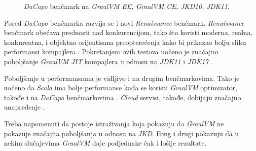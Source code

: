 \documentclass[a4paper]{article}
\begin{document}
\begin{figure}
\begin{center}
\end{center}
    \caption{\emph{DaCapo} benčmark na \emph{GraalVM EE, GraalVM CE, JKD10, JDK11}.}
\label{fig:dacapo}
\end{figure}

Pored \emph{DaCapo} benčmarka razvija se i novi \emph{Renaissance} benčmark. \emph{Renaissance} benčmark obećava prednosti nad konkurencijom, tako što koristi moderna, realna, konkurentna, i objektno orijentisana preopterećenja kako bi prikazao bolju sliku performansi kompajlera \cite{prokopec19}. Pokretanjem ovih testova uočeno je značajno poboljšanje \emph{GraalVM JIT} kompajlera u odnosu na \emph{JDK11} i \emph{JDK17} \cite{renaissance}.

Poboljšanje u performansama je vidljivo i na drugim benčmarkovima. Tako je uočeno da \emph{Scala} ima bolje performanse kada se koristi \emph{GraalVM} optimizator, takođe i na \emph{DaCapo} benčmarkovima \cite{stadler13, dacapo}. \emph{Cloud} servisi, takođe, dobijaju značajno unapređenje \cite{sipek21}. 

Treba napomenuti da postoje istraživanja koja pokazuju da \emph{GraalVM} ne pokazuje značajna poboljšanja u odnosu na \emph{JKD}. Fong i drugi \cite{fong21} pokazuju da u nekim slučajevima \emph{GraalVM} daje podjednake čak i lošije rezultate. 
\end{document}
